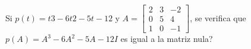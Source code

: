\item Si \(p(t) = t3 − 6t2 − 5t − 12\) y \(A = \begin{bmatrix}2 & 3 & -2 \\ 0 & 5 & 4 \\ 1 & 0 & -1\end{bmatrix}\), 
    se verifica que \(p(A) = A^3 − 6A^2 − 5A − 12I\) es igual a la matriz nula?
